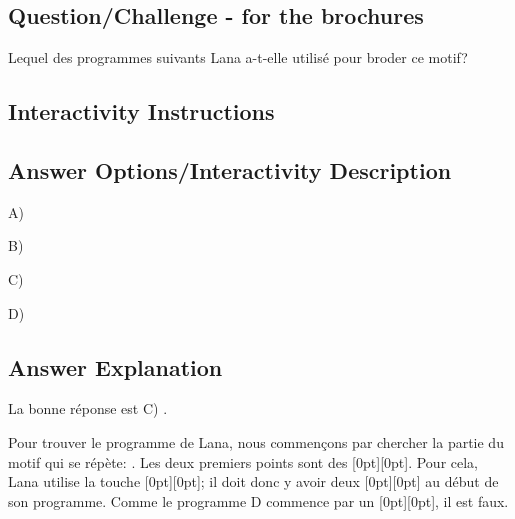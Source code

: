 \documentclass[a4paper,11pt]{report}
\newcommand{\taskGraphicsFolder}{..}
\begin{document}
{\em


\subsection*{Question/Challenge - for the brochures}

Lequel des programmes suivants Lana a-t-elle utilisé pour broder ce motif?

{\centering%
\par}

}


\subsection*{Interactivity Instructions}



\begingroup
\renewcommand{\arraystretch}{1.5}
\subsection*{Answer Options/Interactivity Description}

A) \raisebox{\dimexpr -0.5ex -1.3ex \relax}{}

B) \raisebox{\dimexpr -0.5ex -1.3ex \relax}{}

C) \raisebox{\dimexpr -0.5ex -1.3ex \relax}{}

D) \raisebox{\dimexpr -0.5ex -1.3ex \relax}{}

\endgroup

\subsection*{Answer Explanation}

La bonne réponse est C) \raisebox{-0.5ex}{}.

Pour trouver le programme de Lana, nous commençons par chercher la partie du motif qui se répète: \raisebox{-0.5ex}{}. Les deux premiers points sont des \raisebox{-0.5ex}[0pt][0pt]{}. Pour cela, Lana utilise la touche \raisebox{-0.5ex}[0pt][0pt]{}; il doit donc y avoir deux \raisebox{-0.5ex}[0pt][0pt]{} au début de son programme. Comme le programme D commence par un \raisebox{-0.5ex}[0pt][0pt]{}, il est faux.
\end{document}
